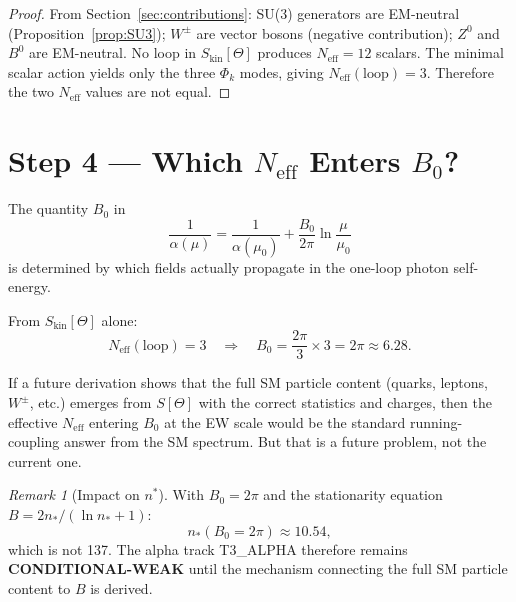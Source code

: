\documentclass[12pt,a4paper]{article}
\theoremstyle{remark}
\newtheorem{remark}[theorem]{Remark}
\newcommand{\Neff}{N_{\mathrm{eff}}}
\begin{document}
\begin{proof}
From Section~\ref{sec:contributions}: SU(3) generators are EM-neutral
(Proposition~\ref{prop:SU3}); $W^\pm$ are vector bosons (negative
contribution); $Z^0$ and $B^0$ are EM-neutral.  No loop in
$S_{\mathrm{kin}}[\Theta]$ produces $\Neff = 12$ scalars.  The minimal
scalar action yields only the three $\Phi_k$ modes, giving
$\Neff(\mathrm{loop}) = 3$.  Therefore the two $\Neff$ values are not
equal.
\end{proof}

\section{Step 4 — Which $\Neff$ Enters $B_0$?}
\label{sec:which}

The quantity $B_0$ in
\begin{equation}
  \frac{1}{\alpha(\mu)}
  = \frac{1}{\alpha(\mu_0)}
  + \frac{B_0}{2\pi}\ln\frac{\mu}{\mu_0}
  \label{eq:running}
\end{equation}
is determined by which fields actually propagate in the one-loop photon
self-energy.

From $S_{\mathrm{kin}}[\Theta]$ alone:
\begin{equation}
  \boxed{
  \Neff(\mathrm{loop}) = 3
  \quad\Rightarrow\quad
  B_0 = \frac{2\pi}{3}\times 3 = 2\pi \approx 6.28.
  }
  \label{eq:B0_audit}
\end{equation}

If a future derivation shows that the full SM particle content
(quarks, leptons, $W^\pm$, etc.) emerges from $S[\Theta]$ with
the correct statistics and charges, then the effective $\Neff$ entering
$B_0$ at the EW scale would be the standard running-coupling answer
from the SM spectrum.  But that is a future problem, not the current one.

\begin{remark}[Impact on $n^*$]
With $B_0 = 2\pi$ and the stationarity equation $B = 2n_*/({\ln n_*+1})$:
\begin{equation}
  n_*(B_0 = 2\pi) \approx 10.54,
\end{equation}
which is not 137.  The alpha track T3\_ALPHA therefore remains
\textbf{CONDITIONAL-WEAK} until the mechanism connecting the full SM
particle content to $B$ is derived.
\end{remark}
\end{document}
